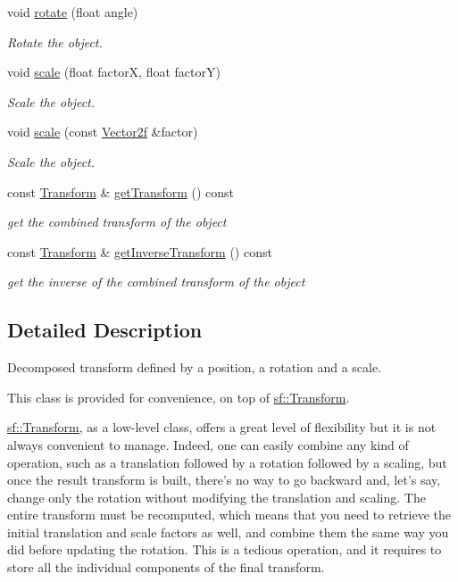 \begin{DoxyCompactItemize}
void \hyperlink{classsf_1_1Transformable_af8a5ffddc0d93f238fee3bf8efe1ebda}{rotate} (float angle)
\begin{DoxyCompactList}\small\item\em Rotate the object. \end{DoxyCompactList}\item 
void \hyperlink{classsf_1_1Transformable_a3de0c6d8957f3cf318092f3f60656391}{scale} (float factor\-X, float factor\-Y)
\begin{DoxyCompactList}\small\item\em Scale the object. \end{DoxyCompactList}\item 
void \hyperlink{classsf_1_1Transformable_adecaa6c69b1f27dd5194b067d96bb694}{scale} (const \hyperlink{classsf_1_1Vector2}{Vector2f} \&factor)
\begin{DoxyCompactList}\small\item\em Scale the object. \end{DoxyCompactList}\item 
const \hyperlink{classsf_1_1Transform}{Transform} \& \hyperlink{classsf_1_1Transformable_a3b48c3362e3e2c14fef7551252deb7bb}{get\-Transform} () const 
\begin{DoxyCompactList}\small\item\em get the combined transform of the object \end{DoxyCompactList}\item 
const \hyperlink{classsf_1_1Transform}{Transform} \& \hyperlink{classsf_1_1Transformable_ab00de62b5d1efb2ee4cf2566dea98175}{get\-Inverse\-Transform} () const 
\begin{DoxyCompactList}\small\item\em get the inverse of the combined transform of the object \end{DoxyCompactList}\end{DoxyCompactItemize}


\subsection{Detailed Description}
Decomposed transform defined by a position, a rotation and a scale. 

This class is provided for convenience, on top of \hyperlink{classsf_1_1Transform}{sf\-::\-Transform}.

\hyperlink{classsf_1_1Transform}{sf\-::\-Transform}, as a low-\/level class, offers a great level of flexibility but it is not always convenient to manage. Indeed, one can easily combine any kind of operation, such as a translation followed by a rotation followed by a scaling, but once the result transform is built, there's no way to go backward and, let's say, change only the rotation without modifying the translation and scaling. The entire transform must be recomputed, which means that you need to retrieve the initial translation and scale factors as well, and combine them the same way you did before updating the rotation. This is a tedious operation, and it requires to store all the individual components of the final transform.

